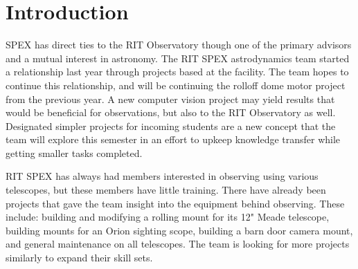 \documentclass[conference]{IEEEtran} %
\begin{document}
\label{sec:nomenclature}
\newcommand{\nomunit}[1]{%
\renewcommand{\nomentryend}{\hspace*{\fill}#1}}
\renewcommand{\nompreamble}{

  }
\printnomenclature{}



\section{Introduction}
\label{sec:introduction}

 SPEX has direct ties to the RIT Observatory though one of the primary advisors and a mutual interest in astronomy.  The RIT SPEX astrodynamics team started a relationship last year through projects based at the facility. The team hopes to continue this relationship, and will be continuing the rolloff dome motor project from the previous year. A new computer vision project may yield results that would be beneficial for observations, but also to the RIT Observatory as well. Designated simpler projects for incoming students are a new concept that the team will explore this semester in an effort to upkeep knowledge transfer while getting smaller tasks completed.

RIT SPEX has always had members interested in observing using various telescopes, but these members have little training. There have already been projects that gave the team insight into the equipment behind observing.  These include: building and modifying a rolling mount for its 12" Meade telescope, building mounts for an Orion sighting scope, building a barn door camera mount, and general maintenance on all telescopes. The team is looking for more projects similarly to expand their skill sets.
\end{document}
